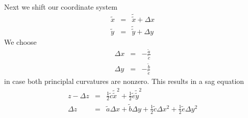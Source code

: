 \documentclass[12pt,a4paper,twoside,openright,BCOR10mm,headsepline,titlepage,abstracton,chapterprefix,final]{scrreprt}
\begin{document}
Next we shift our coordinate system
\begin{eqnarray}
  \tilde{x} &=& \tilde{\tilde{x}} + \Delta x \\
  \tilde{y} &=& \tilde{\tilde{y}} + \Delta y
\end{eqnarray}
%
We choose
\begin{eqnarray}
 \Delta x &=& -\frac{\tilde{a}}{\tilde{c}} \\
 \Delta y &=& -\frac{\tilde{b}}{\tilde{e}}
\end{eqnarray}
in case both principlal curvatures are nonzero. This results in a sag equation
\begin{eqnarray}
  z - \Delta z &=& \frac{1}{2} \tilde{c} \tilde{\tilde{x}}^2 + \frac{1}{2} \tilde{e} \tilde{\tilde{y}}^2 \\
  \Delta z &=& \tilde{a} \Delta x + \tilde{b} \Delta y + \frac{1}{2} \tilde{c} \Delta x^2 + \frac{1}{2} \tilde{e} \Delta y^2
\end{eqnarray}
\end{document}
